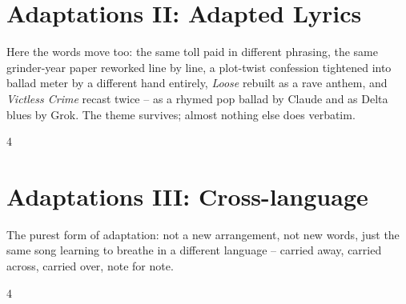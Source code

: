 \documentclass[a4paper,landscape]{memoir}
\begin{document}
\chapter{Adaptations II: Adapted Lyrics}
Here the words move too: the same toll paid in different phrasing, the same grinder-year paper reworked line by line, a plot-twist confession tightened into ballad meter by a different hand entirely, \emph{Loose} rebuilt as a rave anthem, and \emph{Victless Crime} recast twice -- as a rhymed pop ballad by Claude and as Delta blues by Grok. The theme survives; almost nothing else does verbatim.
\clearpage\begin{multicols*}{4}






















\end{multicols*}

\chapter{Adaptations III: Cross-language}
The purest form of adaptation: not a new arrangement, not new words, just the same song learning to breathe in a different language -- carried away, carried across, carried over, note for note.
\clearpage\begin{multicols*}{4}


















\end{multicols*}

\appendix

\backmatter
\printindex[songs]
\clearpage
\printindex[tags]
\end{document}
